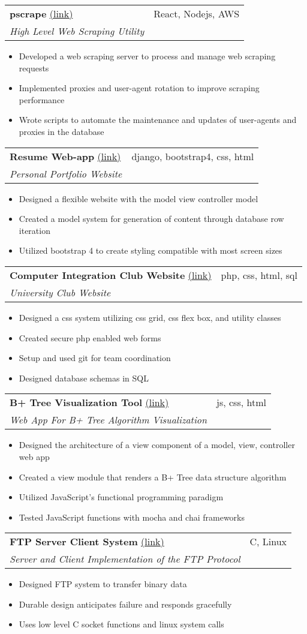 \documentclass[letterpaper,11pt]{article}
\makeatletter
\newcommand{\resumeItem}[2]{
  \item\small{
    \textbf{#1}{ #2 \vspace{-2pt}}
  }
}
\newcommand{\resumeSubheading}[5]{
  \vspace{-1pt}\item
    \begin{tabular*}{0.97\textwidth}[t]{l@{\extracolsep{\fill}}r}
      \textbf{#1} #2 & #3 \\
      \textit{\small#4} & \textit{\small #5} \\
    \end{tabular*}\vspace{-5pt}
}
\newcommand{\resumeSubItem}[2]{\resumeItem{#1}{#2}\vspace{-4pt}}
\newcommand{\resumeItemListStart}{\begin{itemize}[leftmargin=*]}
\newcommand{\resumeItemListEnd}{\end{itemize}\vspace{-5pt}}
\makeatother
\begin{document}
  \resumeSubheading{pscrape}{\href{https://github.com/munikeraragon/p_scrape}{(link)}}{React, Nodejs, AWS}{High Level Web Scraping Utility}{}
    \resumeItemListStart
      \resumeSubItem{}{Developed a web scraping server to process and manage web scraping requests}
      \resumeSubItem{}{Implemented proxies and user-agent rotation to improve scraping performance}
      \resumeSubItem{}{Wrote scripts to automate the maintenance and updates of user-agents and proxies in the database}
    \resumeItemListEnd

  \resumeSubheading{Resume Web-app}{\href{http://www.treverhibbs.com/}{(link)}}{django, bootstrap4, css, html}{Personal Portfolio Website}{}
	\resumeItemListStart
		\resumeSubItem{}{Designed a flexible website with the model view controller model}
		\resumeSubItem{}{Created a model system for generation of content through database row iteration}
		\resumeSubItem{}{Utilized bootstrap 4 to create styling compatible with most screen sizes}
	\resumeItemListEnd

  \resumeSubheading{Computer Integration Club Website}{\href{http://www6.encs.vancouver.wsu.edu/}{(link)}}{php, css, html, sql}{University Club Website}{}
	\resumeItemListStart
		\resumeSubItem{}{Designed a css system utilizing css grid, css flex box, and utility classes}
		\resumeSubItem{}{Created secure php enabled web forms}
		\resumeSubItem{}{Setup and used git for team coordination}
	\resumeSubItem{}{Designed database schemas in SQL}
  \resumeItemListEnd
  
  \resumeSubheading{B+ Tree Visualization Tool}{\href{https://github.com/TreverHibbs/BPlusTree}{(link)}}{js, css, html}{Web App For B+ Tree Algorithm Visualization}{}
	\resumeItemListStart
		\resumeSubItem{}{Designed the architecture of a view component of a model, view, controller web app}
		\resumeSubItem{}{Created a view module that renders a B+ Tree data structure algorithm}
		\resumeSubItem{}{Utilized JavaScript's functional programming paradigm}
	\resumeSubItem{}{Tested JavaScript functions with mocha and chai frameworks}
  \resumeItemListEnd

  \resumeSubheading{FTP Server Client System}{\href{https://github.com/dbutler12/FTP}{(link)}}{C, Linux}{Server and Client Implementation of the FTP Protocol}{}
    \resumeItemListStart
      \resumeSubItem{}{Designed FTP system to transfer binary data}
      \resumeSubItem{}{Durable design anticipates failure and responds gracefully}
      \resumeSubItem{}{Uses low level C socket functions and linux system calls}
    \resumeItemListEnd
\end{document}
